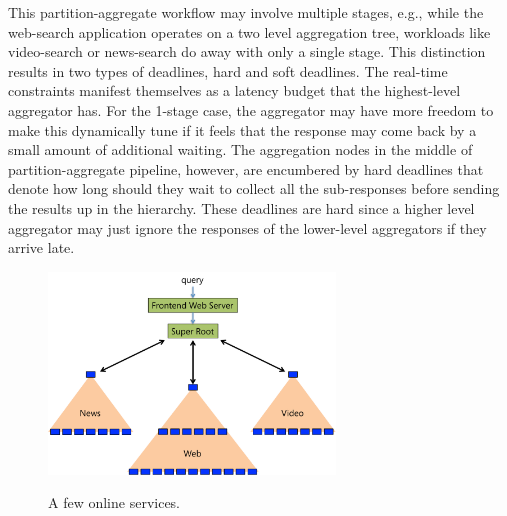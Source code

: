 \documentclass[letterpaper,twocolumn,10pt]{article}
\begin{document}
This partition-aggregate workflow may involve multiple stages, e.g., while the web-search application operates on a two level 
aggregation tree, workloads like video-search or news-search do away with only a single stage. 
This distinction results in two types of deadlines, hard and soft deadlines. 
The real-time constraints manifest themselves as a latency budget that the highest-level aggregator has.
For the 1-stage case, the aggregator may have more freedom to make this dynamically tune 
if it feels that the response may come back by a small amount of additional waiting.
The aggregation nodes in the middle of partition-aggregate pipeline, however, are encumbered by hard deadlines that denote how long should they wait to collect all the sub-responses
before sending the results up in the hierarchy. These deadlines are hard since a higher level aggregator may just ignore the responses of the lower-level aggregators if they arrive late.
\begin{figure}[!t]
\centering
\includegraphics[width=3in]{Figures/Services.pdf}
\label{figure:Services}
\caption{\small A few online services. }
\end{figure}
\end{document}
